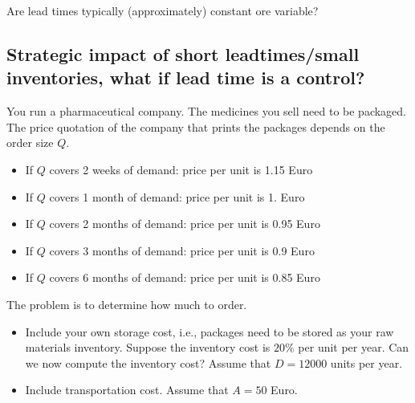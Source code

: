 \begin{exercise}
  Are lead times typically (approximately) constant ore variable?
  \begin{comment}
    TBD
  \end{comment}
\end{exercise}



\subsection{Strategic impact of short leadtimes/small inventories,
  what if lead time is a control?}

You run a pharmaceutical company. The medicines you sell need to be
packaged. The price quotation of the company that prints the packages
depends on the order size $Q$.
  \begin{itemize}
  \item If $Q$ covers 2 weeks of demand: price per unit is 1.15 Euro
  \item If $Q$ covers 1 month of demand: price per unit is 1. Euro
  \item If $Q$ covers 2 months of demand: price per unit is 0.95 Euro
  \item If $Q$ covers 3 months of demand: price per unit is 0.9 Euro
  \item If $Q$ covers 6 months of demand: price per unit is 0.85 Euro
  \end{itemize}
The problem is to determine how much to order.

\begin{exercise}
  \begin{itemize}
  \item Include your own storage cost, i.e., packages need to be
    stored as your raw materials inventory.  Suppose the
    inventory cost is $20\%$ per unit per year. Can we now compute the
    inventory cost?  Assume that $D = 12000$ units per year.
  \item Include transportation cost.  Assume that $A = 50$ Euro.
  \end{itemize}
\end{exercise}

